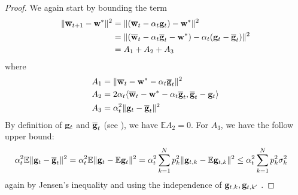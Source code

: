 \begin{proof}
	We again start by bounding the term
	\begin{align*}
	\|{\overline{\mathbf{w}}}_{t+1}-{\mathbf{w}}^{\ast}\|^{2} & =\|({\overline{\mathbf{w}}}_{t}-\alpha_{t}{\mathbf{g}}_{t})-{\mathbf{w}}^{\ast}\|^{2}\\
	& =\|({\overline{\mathbf{w}}}_{t}-\alpha_{t}{\overline{\mathbf{g}}}_{t}-{\mathbf{w}}^{\ast})-\alpha_{t}({\mathbf{g}}_{t}-{\overline{\mathbf{g}}}_{t})\|^{2}\\
	& =A_{1}+A_{2}+A_{3}
	\end{align*}
	where 
	\begin{align*}
	A_{1} & =\|{\overline{\mathbf{w}}}_{t}-{\mathbf{w}}^{\ast}-\alpha_{t}{\overline{\mathbf{g}}}_{t}\|^{2}\\
	A_{2} & =2\alpha_{t}\langle{\overline{\mathbf{w}}}_{t}-{\mathbf{w}}^{\ast}-\alpha_{t}{\overline{\mathbf{g}}}_{t},{\overline{\mathbf{g}}}_{t}-{\mathbf{g}}_{t}\rangle\\
	A_{3} & =\alpha_{t}^{2}\|{\mathbf{g}}_{t}-{\overline{\mathbf{g}}}_{t}\|^{2}
	\end{align*}
	By definition of ${\mathbf{g}}_{t}$ and ${\overline{\mathbf{g}}}_{t}$ (see \eq{\ref{eq:gradient}}), we have $\mathbb{E}A_{2}=0$.
	For $A_{3}$, we have the follow upper bound:
	\begin{align*}
	\alpha_{t}^{2}\mathbb{E}\|{\mathbf{g}}_{t}-{\overline{\mathbf{g}}}_{t}\|^{2} & =\alpha_{t}^{2}\mathbb{E}\|{\mathbf{g}}_{t}-\mathbb{E}{\mathbf{g}}_{t}\|^{2}=\alpha_{t}^{2}\sum_{k=1}^{N}p_{k}^{2}\|{\mathbf{g}}_{t,k}-\mathbb{E}{\mathbf{g}}_{t,k}\|^{2}\leq\alpha_{t}^{2}\sum_{k=1}^{N}p_{k}^{2}\sigma_{k}^{2}
	\end{align*}
	again by Jensen's inequality and using the independence of ${\mathbf{g}}_{t,k},{\mathbf{g}}_{t,k'}$ \cite[Lemma 2]{li2019convergence}. 
	

\end{proof}
